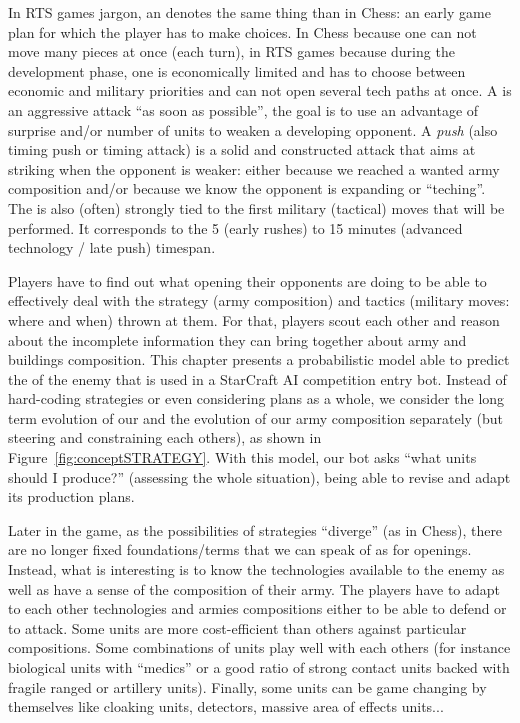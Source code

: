 In RTS games jargon, an \textit{} denotes the same thing than in Chess: an early game plan for which the player has to make choices. In Chess because one can not move many pieces at once (each turn), in RTS games because during the development phase, one is economically limited and has to choose between economic and military priorities and can not open several tech paths at once. A \textit{} is an aggressive attack ``as soon as possible'', the goal is to use an advantage of surprise and/or number of units to weaken a developing opponent. A \textit{push} (also timing push or timing attack) is a solid and constructed attack that aims at striking when the opponent is weaker: either because we reached a wanted army composition and/or because we know the opponent is expanding or ``teching''. The  is also (often) strongly tied to the first military (tactical) moves that will be performed. It corresponds to the 5 (early rushes) to 15 minutes (advanced technology / late push) timespan. 

Players have to find out what opening their opponents are doing to be able to effectively deal with the strategy (army composition) and tactics (military moves: where and when) thrown at them. For that, players scout each other and reason about the incomplete information they can bring together about army and buildings composition. This chapter presents a probabilistic model able to predict the \textit{} of the enemy that is used in a StarCraft AI competition entry bot. Instead of hard-coding strategies or even considering plans as a whole, we consider the long term evolution of our  and the evolution of our army composition separately (but steering and constraining each others), as shown in Figure~\ref{fig:conceptSTRATEGY}. With this model, our bot asks ``what units should I produce?'' (assessing the whole situation), being able to revise and adapt its production plans.

Later in the game, as the possibilities of strategies ``diverge'' (as in Chess), there are no longer fixed foundations/terms that we can speak of as for openings. Instead, what is interesting is to know the technologies available to the enemy as well as have a sense of the composition of their army. The players have to adapt to each other technologies and armies compositions either to be able to defend or to attack. Some units are more cost-efficient than others against particular compositions. Some combinations of units play well with each others (for instance biological units with ``medics'' or a good ratio of strong contact units backed with fragile ranged or artillery units). Finally, some units can be game changing by themselves like cloaking units, detectors, massive area of effects units... 

